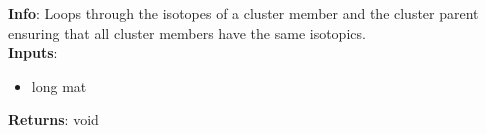 \textbf{Info}: Loops through the isotopes of a cluster member and the cluster
parent ensuring that all cluster members have the same isotopics. \\

\noindent \textbf{Inputs}:
\begin{itemize}
\item{long mat}
\end{itemize}

\noindent \textbf{Returns}: void
